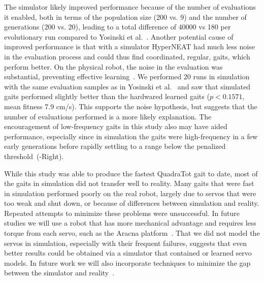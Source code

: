 The simulator likely improved performance because of the number of evaluations it enabled, both in terms of the population size (200 vs. 9) and the number of generations (200 vs. 20), leading
to a total difference of 40000 vs 180 per evolutionary run compared to Yosinski et al.~\cite{yos:clune}. Another
potential cause of improved performance is that with a simulator
HyperNEAT had much less noise in the evaluation process and could thus find coordinated, regular, gaits, which perform better. On the physical robot, the noise in the evaluation was
substantial, preventing effective learning~\cite{yos:clune}. 
We performed 20 runs in simulation with the same evaluation samples as 
in Yosinski et al.~\cite{yos:clune} and saw that simulated gaits performed
slightly better than the hardwared learned gaits ($p < 0.1571$, mean fitness 7.9 cm/s).
This supports the noise hypothesis, but suggests that the number of evaluations performed is a more likely explanation.
The encouragement of low-frequency gaits in this study
also may have aided performance, especially since in simulation the gaits were
high-frequency in a few early generations before rapidly settling to a
 range below the penalized threshold~(-Right).



While this study was able to produce the fastest QuadraTot gait to
date, most of the gaits in simulation did not transfer well to
reality. Many gaits that were fast in simulation performed
poorly on the real robot, largely due to servos that were too weak and
shut down, or because of differences between simulation and
reality. Repeated attempts to minimize these problems were
unsuccessful. 
In future studies we will use a
robot that has more mechanical advantage and requires less torque from
each servo, such as the Aracna platform~\cite{lohmann2012aracna}.
That we did not model the servos in simulation, especially with their frequent failures, suggests that even better results could be obtained via a simulator that contained or learned servo models. In future work we will also incorporate techniques to minimize the gap between the simulator and reality~\cite{koos2010crossing,bongard,zagal}.

